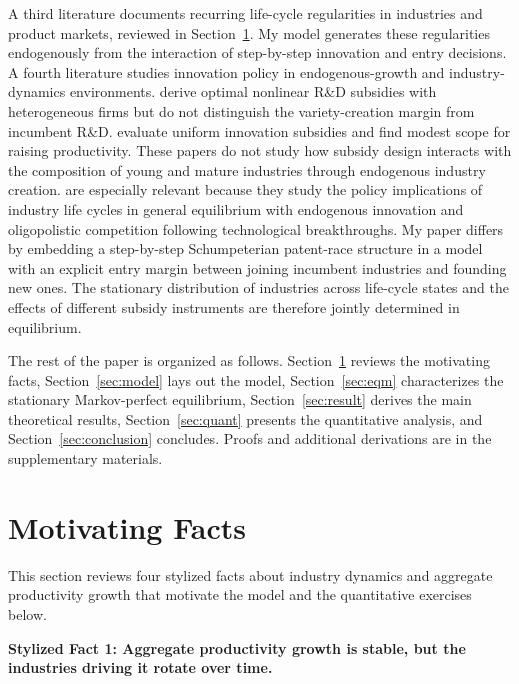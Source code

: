 \documentclass[12pt]{article}
\begin{document}
A third literature documents recurring life-cycle regularities in industries and product markets, reviewed in Section~\ref{sec:motivation}. My model generates these regularities endogenously from the interaction of step-by-step innovation and entry decisions. A fourth literature studies innovation policy in endogenous-growth and industry-dynamics environments. \citet{AkcigitHS22} derive optimal nonlinear R\&D subsidies with heterogeneous firms but do not distinguish the variety-creation margin from incumbent R\&D. \citet{AtkesonB19} evaluate uniform innovation subsidies and find modest scope for raising productivity. These papers do not study how subsidy design interacts with the composition of young and mature industries through endogenous industry creation. \citet{CavenaileGRBS24} are especially relevant because they study the policy implications of industry life cycles in general equilibrium with endogenous innovation and oligopolistic competition following technological breakthroughs. My paper differs by embedding a step-by-step Schumpeterian patent-race structure in a model with an explicit entry margin between joining incumbent industries and founding new ones. The stationary distribution of industries across life-cycle states and the effects of different subsidy instruments are therefore jointly determined in equilibrium.

The rest of the paper is organized as follows. Section~\ref{sec:motivation} reviews the motivating facts, Section~\ref{sec:model} lays out the model, Section~\ref{sec:eqm} characterizes the stationary Markov-perfect equilibrium, Section~\ref{sec:result} derives the main theoretical results, Section~\ref{sec:quant} presents the quantitative analysis, and Section~\ref{sec:conclusion} concludes. Proofs and additional derivations are in the supplementary materials.


\section{Motivating Facts}\label{sec:motivation}
This section reviews four stylized facts about industry dynamics and aggregate productivity growth that motivate the model and the quantitative exercises below.

\medskip
\noindent\textbf{Stylized Fact 1: Aggregate productivity growth is stable, but the industries driving it rotate over time.}
\end{document}
